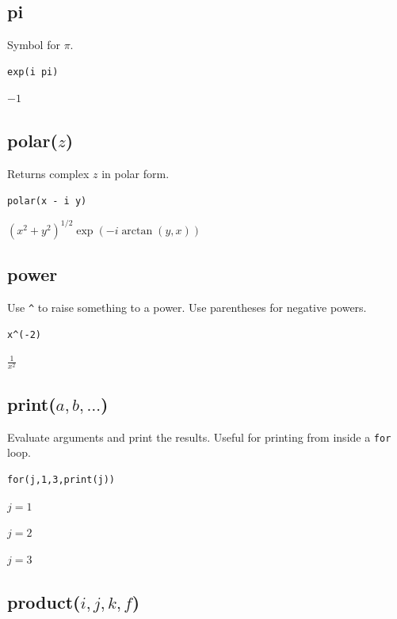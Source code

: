 \documentclass[12pt]{article}
\begin{document}
\subsection*{pi}

Symbol for $\pi$.

{\color{blue}
\begin{verbatim}
exp(i pi)
\end{verbatim}
}

$-1$

\subsection*{polar($z$)}

Returns complex $z$ in polar form.

{\color{blue}
\begin{verbatim}
polar(x - i y)
\end{verbatim}
}

$\displaystyle (x^2+y^2)^{1/2}\exp(-i\arctan(y,x))$

\subsection*{power}

Use \verb$^$ to raise something to a power.
Use parentheses for negative powers.

{\color{blue}
\begin{verbatim}
x^(-2)
\end{verbatim}
}

$\displaystyle \frac{1}{x^2}$

\subsection*{print($a,b,\ldots$)}

Evaluate arguments and print the results.
Useful for printing from inside a {\tt for} loop.

{\color{blue}
\begin{verbatim}
for(j,1,3,print(j))
\end{verbatim}
}

$j=1$

$j=2$

$j=3$

\subsection*{product($i,j,k,f$)}
\end{document}
